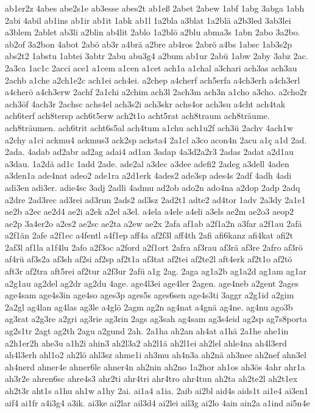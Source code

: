 {ab1er2z
4abes
abe2s1e
ab3esse
abes2t
ab1eß
2abet
2abew
1abf
1abg
3abga
1abh
2abi
4abil
ab1ins
ab1ir
ab1it
1abk
ab1l
1a2bla
a3blat
1a2blä
a2b3led
3ab3lei
a3blem
2ablet
ab3li
a2blin
ab4lit
2ablo
1a2blö
a2blu
abma3s
1abn
2abo
3a2bo.
ab2of
3a2bon
4abot
2abö
ab3r
a4brä
a2bre
ab4ros
2abrö
a4bs
1absc
1ab3s2p
abs2t2
1abstu
1abtei
3abtr
2abu
abu3g4
a2bum
ab1ur
2abü
1abw
2aby
3abz
2ac.
2a3ca
1ac1c
2acci
ace1
a1cem
a1cen
a1cet
ach1a
a1chal
a3chari
ach3as
ach3au
2achb
a1che
a2ch1e2c
ach1ei
ach4ei.
a2chep
a4cherf
ach5erfa
a4ch3erh
a4ch3erl
a4cherö
a4ch3erw
2achf
2a1chi
a2chim
ach3l
2ach3m
ach3n
a1cho
a3cho.
a2cho2r
ach3öf
4ach3r
2achsc
achs4el
ach3s2i
ach3skr
achs4or
ach3su
a4cht
ach4tak
ach6terf
ach8tersp
ach6t5erw
ach2t1o
acht5rat
ach8traum
ach8träume.
ach8träumen.
ach6trit
acht6s5al
ach4tum
a1chu
ach1u2f
ach3ü
2achv
4ach1w
a2chy
a1ci
ackmu4
ackmus3
ack2sp
acksta4
2a1cl
a3co
acon4n
2acu
a1ç
a1d
2ad.
2ada.
4adab
ad2abr
ad2ag
adai4
ad1an
3adap
4a3d2a2r3
2adas
2adat
a2d1au
a3dau.
1a2dä
ad1c
1add
2ade.
ade2al
a3dec
a3dee
adefi2
2adeg
a3dell
4aden
a3den1a
ade4nat
adeo2
ade1ra
a2d1erk
4ades2
ade3sp
ades4s
2adf
4adh
4adi
adi3en
adi3er.
adie4sc
3adj
2adli
4admu
ad2ob
ado2n
ado4na
a2dop
2adp
2adq
a2dre
2ad3rec
ad3rei
ad3run
2ads2
ad3sz
2ad2t1
adte2
ad4tor
1adv
2a3dy
2a1e1
ae2b
a2ec
ae2d4
ae2i
a2ek
a2el
a3el.
a4ela
a4ele
a4eli
a3els
ae2m
ae2o3
aeop2
ae2p
3a4er2o
a2es2
ae2sc
ae2ta
a2ew
ae2x
2afa
af1ab
a2f1a2n
a3far
a2f1au
2afä
a2f1än
2afe
a2f1ec
a4fentl
a4f1ep
aff4a
af2f3l
aff4th
2afi
afi6kanz
afi4kat
afi2t
2af3l
af1la
a1f4lu
2afo
a2f3oc
a2ford
a2f1ort
2afra
af3rau
af3rä
af3re
2afro
af3rö
af4rü
af3s2a
af3sh
af2si
af2sp
af2t1a
af3tat
af2tei
af2te2l
aft4erk
af2t1o
af2tö
aft3r
af2tra
aft5rei
af2tur
a2f3ur
2afü
a1g
2ag.
2aga
ag1a2b
ag1a2d
ag1am
ag1ar
a2g1au
ag2del
ag2dr
ag2du
4age.
age4l3ei
age4ler
2agen.
age4neb
a2gent
2ages
age4sam
age4s3in
age4so
ages3p
ages5s
ages6sen
age4s3ti
3aggr
a2g1id
a2gim
2a2gl
ag4lan
ag4las
ag3le
a4glö
2agm
ag2n
ag4nat
a4gnä
ag4ne.
ag4nu
ago3b
ag3rat
a2g3re
a2gri
ag3rie
ag3rin
2ags
ag3sah
ag4sam
ag3s4eid
ag2sp
ag7s8porta
ag2s1tr
2agt
ag2th
2agu
a2gund
2ah.
2a1ha
ah2an
ah4at
a1hä
2a1he
ahe1in
a2h1er2h
ahe3u
a1h2i
ahin3
ah2l3a2
ah2l1ä
ah2l1ei
ah2lel
ahle4na
ah4l3erd
ah4l3erh
ahl1o2
ah2lö
ahl3sz
ahme1i
ah3mu
ah4n3a
ah2nä
ah3nee
ah2nef
ahn3el
ah4nerd
ahner4e
ahner6le
ahner4n
ah2nin
ah2no
1a2hor
ah1os
ah3ös
4ahr
ahr1a
ah3r2e
ahren6sc
ahre4s3
ahr2ti
ahr4tri
ahr4tro
ahr4tun
ah2ta
ah2te2l
ah2t1ex
ah2t3r
aht1s
a1hu
ah1w
a1hy
2ai.
ai1a4
a1ia.
2aib
ai2bl
aid4s
aids1t
ai1e4
ai3en1
aif4
ai1fr
a4i3g4
a3ik.
ai3ke
ai2lar
ail3d4
ai2lei
ail3g
ai2lo
4ain
ain2a
a1ind
ai5n4e
}
